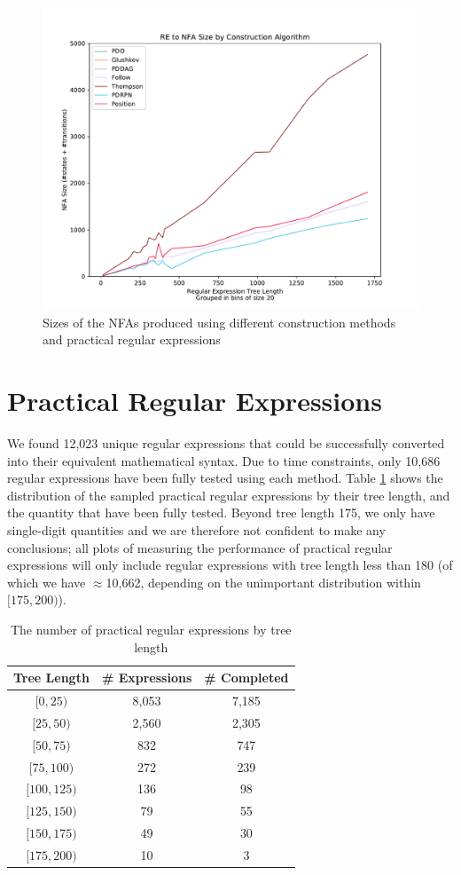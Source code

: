 \begin{figure}[H]
  \center
  \includegraphics[width=0.75\linewidth]{fig/nfa_sizes}
  \caption{Sizes of the NFAs produced using different construction methods and practical regular expressions}
  \label{fig:nfa_sizes}
\end{figure}





\section{Practical Regular Expressions}
\label{sec:Practical Regular Expressions}
We found 12,023 unique regular expressions that could be successfully converted into their equivalent mathematical syntax. Due to time constraints, only 10,686 regular expressions have been fully tested using each method. Table \ref{tbl:practical sample by tree length} shows the distribution of the sampled practical regular expressions by their tree length, and the quantity that have been fully tested. Beyond tree length 175, we only have single-digit quantities and we are therefore not confident to make any conclusions; all plots of measuring the performance of practical regular expressions will only include regular expressions with tree length less than 180 (of which we have  $\approx$10,662, depending on the unimportant distribution within $[175, 200)$).

\begin{table}[H]
  \center
  \begin{tabular}{c|c|c}
    Tree Length & \# Expressions & \# Completed \\
    \hline
    $[0, 25)$     & 8,053 & 7,185 \\
    $[25, 50)$    & 2,560 & 2,305 \\
    $[50, 75)$    & 832   & 747 \\
    $[75, 100)$   & 272   & 239 \\
    $[100, 125)$  & 136   & 98 \\
    $[125, 150)$  & 79    & 55 \\
    $[150, 175)$  & 49    & 30 \\
    $[175, 200)$  & 10    & 3
  \end{tabular}
  \caption{The number of practical regular expressions by tree length}
  \label{tbl:practical sample by tree length}
\end{table}

